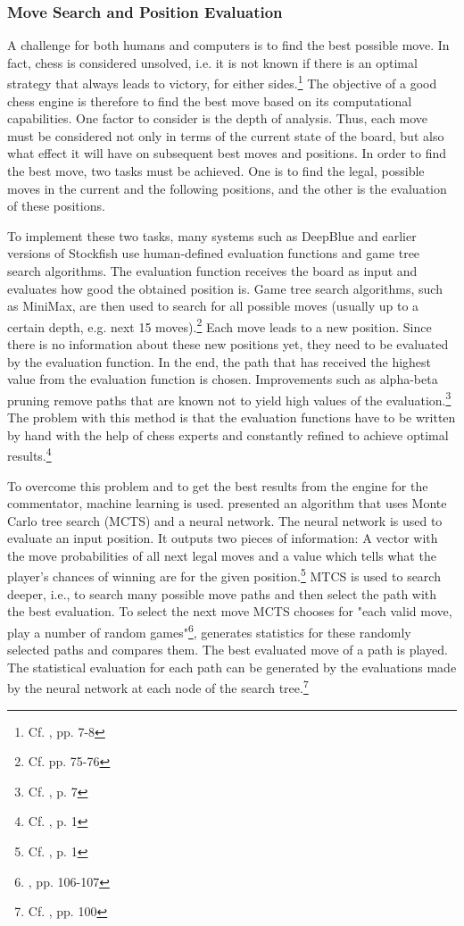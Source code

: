 \subsubsection{Move Search and Position Evaluation}

A challenge for both humans and computers is to find the best possible move. In fact, chess is considered unsolved, i.e. it is not known if there is an optimal strategy that always leads to victory, for either sides.\footnote{Cf. \cite{allis-1994-solving}, pp. 7-8} The objective of a good chess engine is therefore to find the best move based on its computational capabilities. One factor to consider is the depth of analysis. Thus, each move must be considered not only in terms of the current state of the board, but also what effect it will have on subsequent best moves and positions. In order to find the best move, two tasks must be achieved. One is to find the legal, possible moves in the current and the following positions, and the other is the evaluation of these positions.

To implement these two tasks, many systems such as DeepBlue and earlier versions of Stockfish use human-defined evaluation functions and game tree search algorithms. The evaluation function receives the board as input and evaluates how good the obtained position is. Game tree search algorithms, such as MiniMax, are then used to search for all possible moves (usually up to a certain depth, e.g. next 15 moves).\footnote{Cf. \cite{nnfc-2022} pp. 75-76} Each move leads to a new position. Since there is no information about these new positions yet, they need to be evaluated by the evaluation function. In the end, the path that has received the highest value from the evaluation function is chosen. Improvements such as alpha-beta pruning remove paths that are known not to yield high values of the evaluation.\footnote{Cf. \cite{keen-2009-history}, p. 7} The problem with this method is that the evaluation functions have to be written by hand with the help of chess experts and constantly refined to achieve optimal results.\footnote{Cf. \cite{alphazero-2018}, p. 1}

To overcome this problem and to get the best results from the engine for the commentator, machine learning is used. \cite{alphazero-2018} presented an algorithm that uses Monte Carlo tree search (MCTS) and a neural network. The neural network is used to evaluate an input position. It outputs two pieces of information: A vector with the move probabilities of all next legal moves and a value which tells what the player's chances of winning are for the given position.\footnote{Cf. \cite{alphazero-2018}, p. 1} MTCS is used to search deeper, i.e., to search many possible move paths and then select the path with the best evaluation. To select the next move MCTS chooses for "each valid move, play a number of random games"\footnote{\cite{nnfc-2022}, pp. 106-107}, generates statistics for these randomly selected paths and compares them. The best evaluated move of a path is played. The statistical evaluation for each path can be generated by the evaluations made by the neural network at each node of the search tree.\footnote{Cf. \cite{nnfc-2022}, pp. 100}

